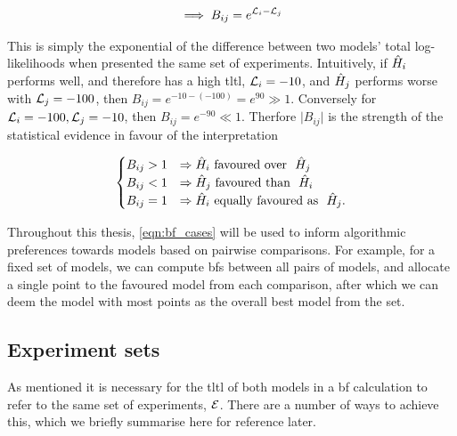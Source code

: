 \begin{equation}
    \label{eqn:bf_succinct}
    \implies B_{ij} = e^{{\mathcal{L}}_{i} - {\mathcal{L}}_{j}}    
\end{equation}


This is simply the exponential of the difference between two models' total log-likelihoods when presented the same set of \glspl{experiment}. 
Intuitively, if $\hat{H}_i$ performs well, and therefore has a high \gls{tltl}, ${\mathcal{L}}_{i}=-10$, 
    and $\hat{H}_j$ performs worse with ${\mathcal{L}}_{j}=-100$, then $B_{ij} = e^{-10-(-100)} = e^{90} \gg 1$.
Conversely for ${\mathcal{L}}_{i}=-100, {\mathcal{L}}_{j}=-10$, then $B_{ij} = e^{-90} \ll 1$. 
Therfore $\lvert B_{ij} \rvert$ is the strength of the statistical evidence
    in favour of the interpretation 

\begin{equation}
    \label{eqn:bf_cases}
    \begin{cases}
        B_{ij} > 1 & \Rightarrow \hat{H}_i \text{\ favoured over \ } \hat{H}_j \\
        B_{ij} < 1 & \Rightarrow \hat{H}_j \text{\ favoured than \ } \hat{H}_i \\
        B_{ij} = 1 & \Rightarrow \hat{H}_i \text{\ equally favoured as \ } \hat{H}_j. \\
    \end{cases}
\end{equation} 

Throughout this thesis, \cref{eqn:bf_cases} will be used to inform algorithmic 
    preferences towards models based on pairwise comparisons.
For example, for a fixed set of models,
    we can compute \glspl{bf} between all pairs of models, 
    and allocate a single point to the favoured model from each comparison, 
    after which we can deem the model with most points as the overall best model from the set. 

\subsection{Experiment sets}\label{sec:experiments_for_bf}
As mentioned it is necessary for the \gls{tltl} of both models in a \gls{bf} calculation to
    refer to the same set of \glspl{experiment}, ${ \mathcal{E} }$. 
There are a number of ways to achieve this, 
    which we briefly summarise here for reference later. 
\par 

